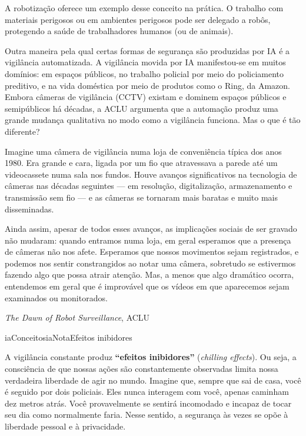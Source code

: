 \documentclass[
  11pt,
]{article}
\renewenvironment{quote}
  {\begin{tcolorbox}[
      breakable, enhanced jigsaw, rounded corners,
      arc=3pt, boxrule=0pt, frame hidden,
      colback=iaCaso,
      borderline west={3pt}{0pt}{iaRiscos},
      left=12pt, right=10pt, top=9pt, bottom=9pt,
      before skip=9pt, after skip=9pt]}
  {\end{tcolorbox}}
\newenvironment{nota}[1][Nota]{\begin{iabox}{iaConceitos}{iaNota}{#1}}{\end{iabox}}
\begin{document}
A robotização oferece um exemplo desse conceito na prática. O trabalho
com materiais perigosos ou em ambientes perigosos pode ser delegado a
robôs, protegendo a saúde de trabalhadores humanos (ou de animais).

Outra maneira pela qual certas formas de segurança são produzidas por IA
é a vigilância automatizada. A vigilância movida por IA manifestou-se em
muitos domínios: em espaços públicos, no trabalho policial por meio do
policiamento preditivo, e na vida doméstica por meio de produtos como o
Ring, da Amazon. Embora câmeras de vigilância (CCTV) existam e dominem
espaços públicos e semipúblicos há décadas, a ACLU argumenta que a
automação produz uma grande mudança qualitativa no modo como a
vigilância funciona. Mas o que é tão diferente?

\begin{quote}
Imagine uma câmera de vigilância numa loja de conveniência típica dos
anos 1980. Era grande e cara, ligada por um fio que atravessava a parede
até um videocassete numa sala nos fundos. Houve avanços significativos
na tecnologia de câmeras nas décadas seguintes --- em resolução,
digitalização, armazenamento e transmissão sem fio --- e as câmeras se
tornaram mais baratas e muito mais disseminadas.

Ainda assim, apesar de todos esses avanços, as implicações sociais de
ser gravado não mudaram: quando entramos numa loja, em geral esperamos
que a presença de câmeras não nos afete. Esperamos que nossos movimentos
sejam registrados, e podemos nos sentir constrangidos ao notar uma
câmera, sobretudo se estivermos fazendo algo que possa atrair atenção.
Mas, a menos que algo dramático ocorra, entendemos em geral que é
improvável que os vídeos em que aparecemos sejam examinados ou
monitorados.

\emph{The Dawn of Robot Surveillance}, ACLU
\end{quote}

\begin{nota}[Efeitos inibidores]

A vigilância constante produz \textbf{``efeitos inibidores''}
(\emph{chilling effects}). Ou seja, a consciência de que nossas ações
são constantemente observadas limita nossa verdadeira liberdade de agir
no mundo. Imagine que, sempre que sai de casa, você é seguido por dois
policiais. Eles nunca interagem com você, apenas caminham dez metros
atrás. Você provavelmente se sentirá incomodado e incapaz de tocar seu
dia como normalmente faria. Nesse sentido, a segurança às vezes se opõe
à liberdade pessoal e à privacidade.

\end{nota}
\end{document}
